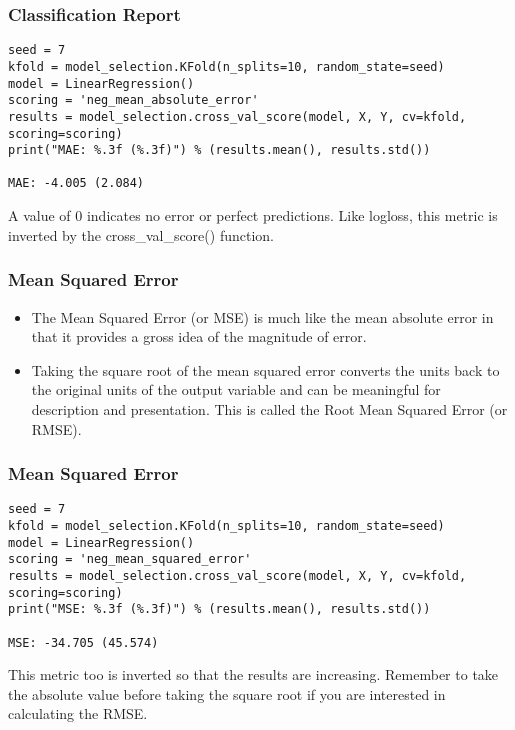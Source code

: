 \begin{frame}[fragile]\frametitle{Classification Report}
\begin{lstlisting}
seed = 7
kfold = model_selection.KFold(n_splits=10, random_state=seed)
model = LinearRegression()
scoring = 'neg_mean_absolute_error'
results = model_selection.cross_val_score(model, X, Y, cv=kfold, scoring=scoring)
print("MAE: %.3f (%.3f)") % (results.mean(), results.std())

MAE: -4.005 (2.084)
\end{lstlisting}

A value of 0 indicates no error or perfect predictions. Like logloss, this metric is inverted by the cross\_val\_score() function.
\end{frame}


\begin{frame}[fragile]\frametitle{Mean Squared Error}

	\begin{itemize}
	\item The Mean Squared Error (or MSE) is much like the mean absolute error in that it provides a gross idea of the magnitude of error.
	\item Taking the square root of the mean squared error converts the units back to the original units of the output variable and can be meaningful for description and presentation. This is called the Root Mean Squared Error (or RMSE).
	\end{itemize}

\end{frame}

\begin{frame}[fragile]\frametitle{Mean Squared Error}
\begin{lstlisting}
seed = 7
kfold = model_selection.KFold(n_splits=10, random_state=seed)
model = LinearRegression()
scoring = 'neg_mean_squared_error'
results = model_selection.cross_val_score(model, X, Y, cv=kfold, scoring=scoring)
print("MSE: %.3f (%.3f)") % (results.mean(), results.std())

MSE: -34.705 (45.574)
\end{lstlisting}

This metric too is inverted so that the results are increasing. Remember to take the absolute value before taking the square root if you are interested in calculating the RMSE.
\end{frame}


